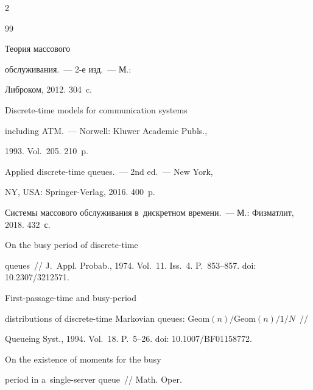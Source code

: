 \begin{multicols}{2}
{{\begin{thebibliography}{99}

     Теория массового

    обслуживания.~--- 2-е изд.~--- М.:

    Либроком, 2012. 304~c.

    


     Discrete-time models for communication systems

    including ATM.~--- Norwell: Kluwer Academic Publs.,

    1993.  Vol.~205. 210~p.

    


     Applied discrete-time queues.~--- 2nd ed.~--- New York,

    NY, USA: Springer-Verlag, 2016. 400~p.

    


     Системы массового обслуживания в~дискретном времени.~--- М.: Физматлит, 2018. 432~с.

    

  

    


    On the busy period of discrete-time

    queues~// J.~Appl. Probab., 1974. Vol.~11. Iss.~4. P.~853--857. doi: 10.2307/3212571.

    


 First-passage-time and busy-period

    distributions of discrete-time Markovian queues: $\mathrm{Geom}(n)/\mathrm{Geom}(n)/1/N$~//

    Queueing Syst., 1994. Vol.~18. P.~5--26. doi: 10.1007/BF01158772.

    


 On the existence of moments for the busy

    period in a~single-server queue~// Math. Oper.


\end{thebibliography}}}
\end{multicols}
